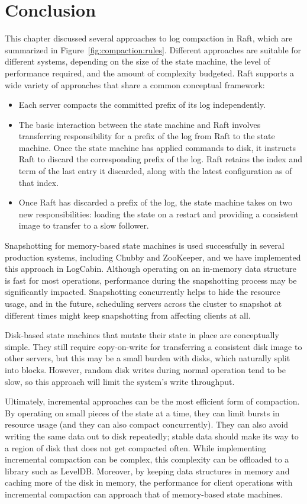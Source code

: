\section{Conclusion}
\label{compaction:conclusion}

This chapter discussed several approaches to log compaction in Raft,
which are summarized in Figure~\ref{fig:compaction:rules}. Different
approaches are suitable for different systems, depending on the size of
the state machine, the level of performance required, and the amount of
complexity budgeted.
Raft supports a wide variety of approaches that share a common
conceptual framework:
%
\begin{itemize}
%
\item Each server compacts the committed prefix of its log
independently.
%
\item The basic interaction between the state machine and Raft involves
transferring responsibility for a prefix of the log from Raft to the
state machine. Once the state machine has applied commands to disk, it
instructs Raft to discard the corresponding prefix of the log. Raft
retains the index and term of the last entry it discarded, along with
the latest configuration as of that index.
%
\item Once Raft has discarded a prefix of the log, the state machine
takes on two new responsibilities: loading the state on a restart and
providing a consistent image to transfer to a slow follower.
%
\end{itemize}

Snapshotting for memory-based state machines is used successfully in
several production systems, including Chubby and ZooKeeper,
and we have implemented this approach in LogCabin. Although
operating on an in-memory data structure is fast for most operations,
performance during the snapshotting process may be significantly
impacted. Snapshotting
concurrently helps to hide the resource usage, and in the future,
scheduling servers across the cluster to snapshot at different times
might keep snapshotting from affecting clients at all.

Disk-based state machines that mutate their state in place are
conceptually simple. They still require copy-on-write for transferring a
consistent disk image to other servers, but this may be a small burden
with disks, which naturally split into blocks. However, random disk writes
during normal operation tend to be slow, so this approach will limit the
system's write throughput.

Ultimately, incremental approaches can be the most efficient form of
compaction. By
operating on small pieces of the state at a time, they can limit bursts
in resource usage (and they can also compact concurrently). They can
also avoid writing the same data out to disk repeatedly; stable
data should make its way to a region of disk that does not get
compacted often. While implementing incremental compaction can be complex, this
complexity can be offloaded to a library such as LevelDB. Moreover, by
keeping data structures in memory and caching more of the disk in
memory, the performance for client operations with incremental
compaction can approach that of memory-based state machines.
